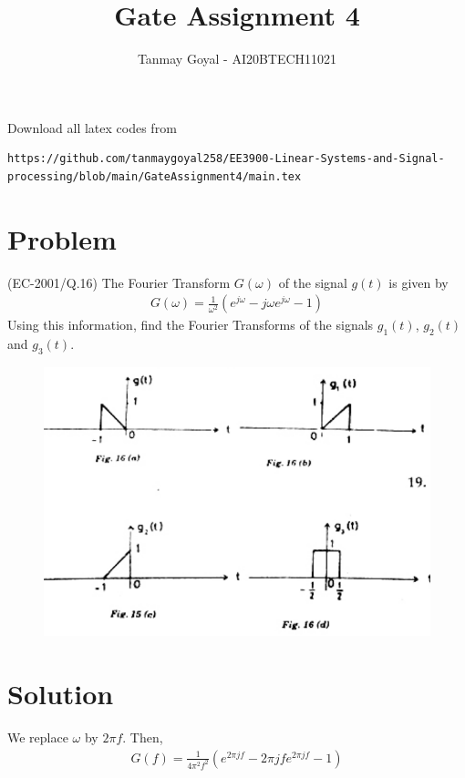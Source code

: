 \documentclass[journal,12pt,twocolumn]{IEEEtran}
\begin{document}
\def\putbox#1#2#3{\makebox[0in][l]{\makebox[#1][l]{}\raisebox{\baselineskip}[0in][0in]{\raisebox{#2}[0in][0in]{#3}}}}
     \def\rightbox#1{\makebox[0in][r]{#1}}
     \def\centbox#1{\makebox[0in]{#1}}
     \def\topbox#1{\raisebox{-\baselineskip}[0in][0in]{#1}}
     \def\midbox#1{\raisebox{-0.5\baselineskip}[0in][0in]{#1}}
\vspace{3cm}
\title{Gate Assignment 4}
\author{Tanmay Goyal - AI20BTECH11021}
\maketitle
\newpage
\bigskip
\renewcommand{\thefigure}{\theenumi}
\renewcommand{\thetable}{\theenumi}

Download all latex codes from 
\begin{lstlisting}
https://github.com/tanmaygoyal258/EE3900-Linear-Systems-and-Signal-processing/blob/main/GateAssignment4/main.tex
\end{lstlisting}
\section{Problem}
(EC-2001/Q.16) The Fourier Transform $G(\omega)$ of the signal $g(t)$ is given by 
\begin{align}
    G(\omega) = \frac{1}{\omega^2}(e^{j\omega} - j\omega e^{j\omega} - 1)
\end{align}
Using this information, find the Fourier Transforms of the signals $g_1(t)$, $g_2(t)$ and $g_3(t)$.
\begin{figure}[!ht]
\centering
 \includegraphics[width=\columnwidth]{Question.png}
\end{figure}
\section{Solution}
We replace $\omega$ by $2\pi f$.
Then, 
\begin{align}
    G(f) = \frac{1}{4\pi^2 f^2}(e^{2\pi jf} - 2\pi jf e^{2\pi jf} -1)
\end{align}\\
\end{document}
